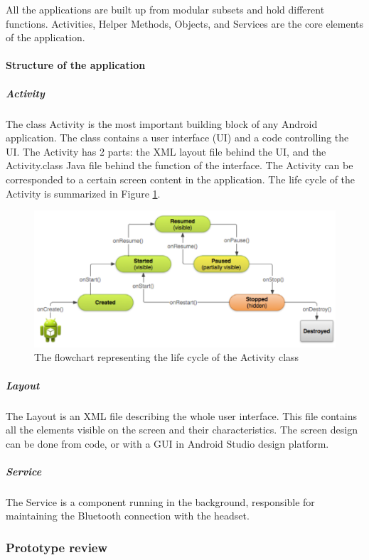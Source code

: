 \documentclass[letterpaper,10pt]{article}
\begin{document}
All the applications are built  up from modular subsets and hold different functions. Activities, Helper Methods, Objects, and Services are the core elements of the application.

\paragraph{Structure of the application}

\subparagraph{Activity} The class Activity is the most important building block of any Android application. The class contains a user interface (UI) and a code controlling the UI. The Activity has 2 parts: the XML layout file behind the UI, and the Activity.class Java file behind the function of the interface. The Activity can be corresponded to a certain screen content in the application. The life cycle of the Activity is summarized in Figure \ref{img:activity}. 


\begin{figure}[h]
\centering
\includegraphics[scale=0.4]{android.PNG}
\caption[The flowchart representing the life cycle of the Activity class]{The flowchart representing the life cycle of the Activity class \cite{develop}}
\label{img:activity}
\end{figure}

\subparagraph{Layout} The Layout is an XML file describing the whole user interface. This file contains all the elements visible on the screen and their characteristics. The screen design can be done from code, or with a GUI in Android Studio design platform. 

\subparagraph{Service} The Service is a component running in the background, responsible for maintaining the Bluetooth connection with the headset.


\subsubsection{Prototype review}
\end{document}

